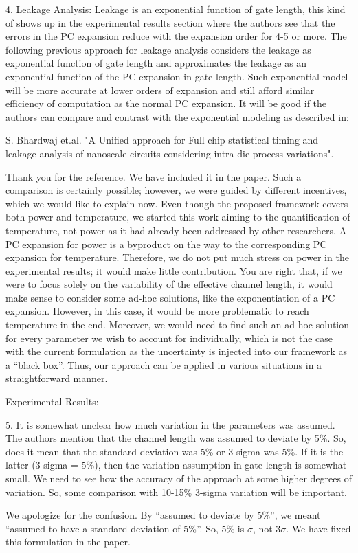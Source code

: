 \begin{reviewer}
4. Leakage Analysis: Leakage is an exponential function of gate length, this kind of shows up in the experimental results section where the authors see that the errors in the PC expansion reduce with the expansion order for 4-5 or more. The following previous approach for leakage analysis considers the leakage as exponential function of gate length and approximates the leakage as an exponential function of the PC expansion in gate length. Such exponential model will be more accurate at lower orders of expansion and still afford similar efficiency of computation as the normal PC expansion. It will be good if the authors can compare and contrast with the exponential modeling as described in:

S. Bhardwaj et.al. "A Unified approach for Full chip statistical timing and leakage analysis of nanoscale circuits considering intra-die process variations".
\end{reviewer}
\begin{authors}
Thank you for the reference.
We have included it in the paper.
Such a comparison is certainly possible; however, we were guided by different incentives, which we would like to explain now.
Even though the proposed framework covers both power and temperature, we started this work aiming to the quantification of temperature, not power as it had already been addressed by other researchers.
A PC expansion for power is a byproduct on the way to the corresponding PC expansion for temperature.
Therefore, we do not put much stress on power in the experimental results; it would make little contribution.
You are right that, if we were to focus solely on the variability of the effective channel length, it would make sense to consider some ad-hoc solutions, like the exponentiation of a PC expansion.
However, in this case, it would be more problematic to reach temperature in the end.
Moreover, we would need to find such an ad-hoc solution for every parameter we wish to account for individually, which is not the case with the current formulation as the uncertainty is injected into our framework as a ``black box''.
Thus, our approach can be applied in various situations in a straightforward manner.
\end{authors}

\begin{reviewer}
Experimental Results:

5. It is somewhat unclear how much variation in the parameters was assumed. The authors mention that the channel length was assumed to deviate by 5\%. So, does it mean that the standard deviation was 5\% or 3-sigma was 5\%. If it is the latter (3-sigma = 5\%), then the variation assumption in gate length is somewhat small. We need to see how the accuracy of the approach at some higher degrees of variation. So, some comparison with 10-15\% 3-sigma variation will be important.
\end{reviewer}
\begin{authors}
We apologize for the confusion. By ``assumed to deviate by 5\%'', we meant ``assumed to have a standard deviation of 5\%''. So, 5\% is $\sigma$, not $3 \sigma$.
We have fixed this formulation in the paper.
\end{authors}

